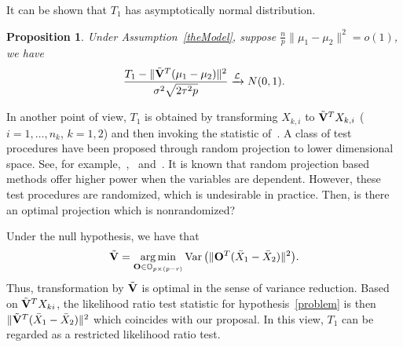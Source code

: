 \documentclass[review]{elsarticle}
\DeclareMathOperator{\myVar}{Var}
\theoremstyle{plain}
\newtheorem{proposition}{\quad\quad Proposition}
\theoremstyle{definition}
\theoremstyle{remark}
\begin{document}
It can be shown that $T_1$ has asymptotically normal distribution.
\begin{proposition}\label{oracleTheorem}
    Under Assumption~\ref{theModel}, suppose $\frac{n}{p}\|\mu_1-\mu_2\|^2= o(1)$, we have 
    \begin{equation*}
        \frac{T_1-\|\tilde{\mathbf{V}}^T(\mu_1-\mu_2)\|^2}
        {\sigma^2\sqrt{2\tau^2 p}}\xrightarrow{\mathcal{L}}N(0,1).
    \end{equation*}
\end{proposition}

In another point of view, $T_1$ is obtained by transforming $X_{k,i}$ to $\tilde{\mathbf{V}}^T X_{k,i}$ ($i=1,\ldots, n_k$, $k=1,2$) and then invoking the statistic of~\cite{Chen2010A}.
A class of test procedures have been proposed through random projection to lower dimensional space. See, for example,~\cite{Lopes2015A},~\cite{Thulin2014A} and~\cite{Srivastava2014RAPTT}.
It is known that random projection based methods offer higher power when the variables are dependent.
However, these test procedures are randomized, which is undesirable in practice.
Then, is there an optimal projection which is nonrandomized?

Under the null hypothesis, we have that
$$
\tilde{\BV}=\mathop{\operatorname{arg\,min}}_{\BO\in\mathbb{O}_{p\times(p-r)}}\myVar\big(\|\BO^T(\bar{X}_1-\bar{X}_2)\|^2\big).
$$
Thus, transformation by $\tilde{\mathbf{V}}$ is optimal in the sense of variance reduction.
 Based on $\tilde{\mathbf{V}}^T X_{ki}$, the likelihood ratio test statistic for hypothesis~\eqref{problem} is then
    $\|\tilde{\mathbf{V}}^T (\bar{X}_1-\bar{X}_2)\|^2$ which coincides with our proposal.
    In this view, $T_1$ can be regarded as a restricted likelihood ratio test.
\end{document}

